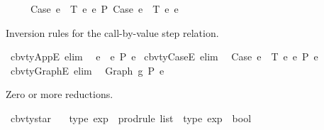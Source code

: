 \begin{isabellebody}
\ \ \ \ \ Case\ e{}\ {\isasymGamma}\ T\ e{}\ e{}\ {\isacharminus}{\kern0pt}{\isachargreater}{\kern0pt}{\isacharbraceleft}{\kern0pt}P{\isacharbraceright}{\kern0pt}\ Case\ e{}{\isacharprime}{\kern0pt}\ {\isasymGamma}\ T\ e{}\ e{}{\isachardoublequoteclose}%
\begin{isamarkuptext}%
Inversion rules for the call-by-value step relation.%
\end{isamarkuptext}\isamarkuptrue%
\isamarkupfalse%
\ cbv{\isacharunderscore}{\kern0pt}ty{\isacharunderscore}{\kern0pt}AppE\ {\isacharbrackleft}{\kern0pt}elim{\isacharbang}{\kern0pt}{\isacharbrackright}{\kern0pt}{\isacharcolon}{\kern0pt}\isanewline
\ \ {\isachardoublequoteopen}e{}\ {\isasymcdot}\ e{}\ {\isacharminus}{\kern0pt}{\isachargreater}{\kern0pt}{\isacharbraceleft}{\kern0pt}P{\isacharbraceright}{\kern0pt}\ e{\isachardoublequoteclose}\isanewline
\isanewline
{}\isamarkupfalse%
\ cbv{\isacharunderscore}{\kern0pt}ty{\isacharunderscore}{\kern0pt}CaseE\ {\isacharbrackleft}{\kern0pt}elim{\isacharbang}{\kern0pt}{\isacharbrackright}{\kern0pt}{\isacharcolon}{\kern0pt}\isanewline
\ \ {\isachardoublequoteopen}Case\ e{}\ {\isasymGamma}\ T\ e{}\ e{}\ {\isacharminus}{\kern0pt}{\isachargreater}{\kern0pt}{\isacharbraceleft}{\kern0pt}P{\isacharbraceright}{\kern0pt}\ e{\isachardoublequoteclose}\isanewline
\isanewline
{}\isamarkupfalse%
\ cbv{\isacharunderscore}{\kern0pt}ty{\isacharunderscore}{\kern0pt}GraphE\ {\isacharbrackleft}{\kern0pt}elim{\isacharbang}{\kern0pt}{\isacharbrackright}{\kern0pt}{\isacharcolon}{\kern0pt}\isanewline
\ \ {\isachardoublequoteopen}Graph\ g\ {\isacharminus}{\kern0pt}{\isachargreater}{\kern0pt}{\isacharbraceleft}{\kern0pt}P{\isacharbraceright}{\kern0pt}\ e{\isachardoublequoteclose}%
\begin{isamarkuptext}%
Zero or more reductions.%
\end{isamarkuptext}\isamarkuptrue%
\isamarkupfalse%
\ cbv{\isacharunderscore}{\kern0pt}ty{\isacharunderscore}{\kern0pt}star\ {\isacharcolon}{\kern0pt}{\isacharcolon}{\kern0pt}\isanewline
\ \ {\isachardoublequoteopen}type\ exp\ {\isacharequal}{\kern0pt}{\isachargreater}{\kern0pt}\ prodrule\ list\ {\isacharequal}{\kern0pt}{\isachargreater}{\kern0pt}\ type\ exp\ {\isacharequal}{\kern0pt}{\isachargreater}{\kern0pt}\ bool{\isachardoublequoteclose}\isanewline

\end{isabellebody}
